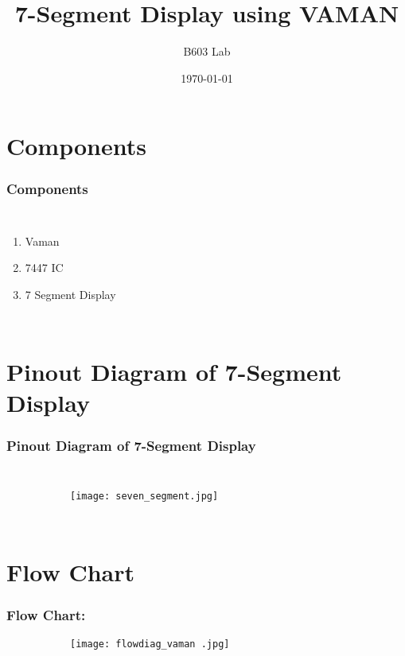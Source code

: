 \documentclass{beamer}
\title{7-Segment Display using VAMAN}
\author{B603 Lab}
\institute{Indian Institute of Technology, Hyderabad.}
\date{\today}
\begin{document}
\begin{frame}
\titlepage
\end{frame}

\section{Components}
\begin{frame}
\frametitle{Components}
\begin{columns}
  \begin{enumerate}
  \item Vaman
  \vspace{10pt}
  \item 7447 IC
  \vspace{10pt}
  \item 7 Segment Display
  \end{enumerate}
\end{columns}
\end{frame}

\section{Pinout Diagram of 7-Segment Display}
\begin{frame}
\frametitle{Pinout Diagram of 7-Segment Display}
\begin{columns}
\begin{figure}[h!]
  \centering
  \begin{subfigure}[b]{0.75\linewidth}
    \texttt{[image: seven\_segment.jpg]}
  \end{subfigure}
\end{figure}
\end{columns}
\end{frame}

\section{Flow Chart }
\begin{frame}
\frametitle{Flow Chart: }
\begin{figure}[h!]
  \centering
  \begin{subfigure}[b]{0.75\linewidth}
    \texttt{[image: flowdiag\_vaman .jpg]}
  \end{subfigure}
\end{figure}
\end{frame}
\end{document}
